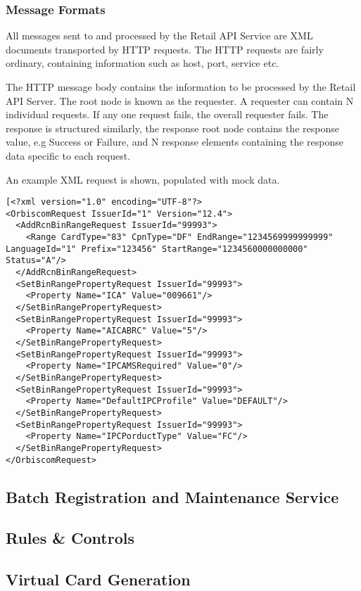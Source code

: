 \documentclass[a4paper,12pt, titlepage]{article}
\begin{document}
\subsubsection{Message Formats}
All messages sent to and processed by the Retail API Service are XML documents transported by HTTP requests. The HTTP requests are fairly ordinary, containing information such as host, port, service etc.

The HTTP message body contains the information to be processed by the Retail API Server. The root node is known as the requester. A requester can contain N individual requests. If any one request fails, the overall requester fails. The response is structured similarly, the response root node contains the response value, e.g Success or Failure, and N response elements containing the response data specific to each request.

An example XML request is shown, populated with mock data.
\begin{verbatim}
[<?xml version="1.0" encoding="UTF-8"?>
<OrbiscomRequest IssuerId="1" Version="12.4">
  <AddRcnBinRangeRequest IssuerId="99993">
    <Range CardType="83" CpnType="DF" EndRange="1234569999999999" LanguageId="1" Prefix="123456" StartRange="1234560000000000" Status="A"/>
  </AddRcnBinRangeRequest>
  <SetBinRangePropertyRequest IssuerId="99993">
    <Property Name="ICA" Value="009661"/>
  </SetBinRangePropertyRequest>
  <SetBinRangePropertyRequest IssuerId="99993">
    <Property Name="AICABRC" Value="5"/>
  </SetBinRangePropertyRequest>
  <SetBinRangePropertyRequest IssuerId="99993">
    <Property Name="IPCAMSRequired" Value="0"/>
  </SetBinRangePropertyRequest>
  <SetBinRangePropertyRequest IssuerId="99993">
    <Property Name="DefaultIPCProfile" Value="DEFAULT"/>
  </SetBinRangePropertyRequest>
  <SetBinRangePropertyRequest IssuerId="99993">
    <Property Name="IPCPorductType" Value="FC"/>
  </SetBinRangePropertyRequest>
</OrbiscomRequest>
\end{verbatim}


\subsection{Batch Registration and Maintenance Service}

\subsection{Rules \& Controls}

\subsection{Virtual Card Generation}
\end{document}
